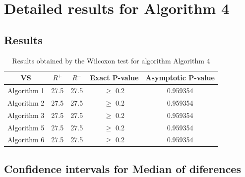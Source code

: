 \documentclass[a4paper,10pt]{article}
\begin{document}
 \clearpage 


\section{Detailed results for Algorithm 4}


\subsection{Results}

\begin{table}[!htp]
\centering\small
\begin{tabular}{
|c|c|c|c|c|}
\hline
 VS & $R^{+}$ & $R^{-}$ & Exact P-value & Asymptotic P-value \\ \hline 
Algorithm 1 & 27.5 & 27.5 & $\geq$ 0.2 & 0.959354\\ \hline 
Algorithm 2 & 27.5 & 27.5 & $\geq$ 0.2 & 0.959354\\ \hline 
Algorithm 3 & 27.5 & 27.5 & $\geq$ 0.2 & 0.959354\\ \hline 
Algorithm 5 & 27.5 & 27.5 & $\geq$ 0.2 & 0.959354\\ \hline 
Algorithm 6 & 27.5 & 27.5 & $\geq$ 0.2 & 0.959354\\ \hline 

\end{tabular}
\caption{Results obtained by the Wilcoxon test for algorithm Algorithm 4}
\end{table}

\subsection{Confidence intervals for Median of diferences}
\end{document}
